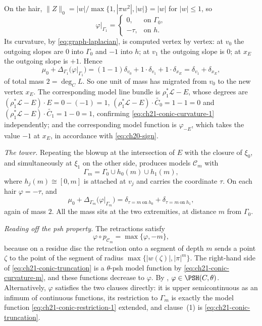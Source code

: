 \begin{example}
On the hair, $\lVert Z\rVert_0=|w|/\max\{1,|\pi w^2|,|w|\}=|w|$ for
$|w|\leq1$, so
\begin{equation}
\label{eq:ch21-conic-restriction-1}
 \varphi|_{\Gamma_1}=
 \begin{cases}
  0, & \text{on }\Gamma_0,\\
  -\tau, & \text{on }h .
 \end{cases}
\end{equation}
Its curvature, by \eqref{eq:graph-laplacian}, is computed vertex by vertex:
at $v_0$ the outgoing slopes are $0$ into $\Gamma_0$ and $-1$ into
$h$; at $v_1$ the outgoing slope is $0$; at $x_E$ the outgoing slope
is $+1$.  Hence
\begin{equation}
\label{eq:ch21-conic-curvature-1}
 \mu_0+\Delta_{\Gamma_1}\bigl(\varphi|_{\Gamma_1}\bigr)
 =(1-1)\delta_{v_0}+1\cdot\delta_{v_1}+1\cdot\delta_{x_E}
 =\delta_{v_1}+\delta_{x_E},
\end{equation}
of total mass $2=\deg_CL$.  So one unit of mass has migrated from
$v_0$ to the new vertex $x_E$.  The corresponding model line bundle is
$\rho_1^*\mathcal L-E$, whose degrees are
$(\rho_1^*\mathcal L-E)\cdot E=0-(-1)=1$,
$(\rho_1^*\mathcal L-E)\cdot\widetilde{C_0}=1-1=0$ and
$(\rho_1^*\mathcal L-E)\cdot\widetilde{C_1}=1-0=1$, confirming
\eqref{eq:ch21-conic-curvature-1} independently; and the corresponding
model function is $\varphi_{-E}$, which takes the value $-1$ at
$x_E$, in accordance with \eqref{eq:ch20-sign}.

\emph{The tower.}  Repeating the blowup at the intersection of $E$ with
the closure of $\xi_0$, and simultaneously at $\xi_1$ on the other side,
produces models $\mathcal C_m$ with
\[
 \Gamma_m=\Gamma_0\cup h_0(m)\cup h_1(m),
\]
where $h_j(m)\cong[0,m]$ is attached at $v_j$ and carries the
coordinate $\tau$.  On each hair $\varphi=-\tau$, and
\begin{equation}
\label{eq:ch21-conic-curvature-m}
 \mu_0+\Delta_{\Gamma_m}\bigl(\varphi|_{\Gamma_m}\bigr)
 =\delta_{\tau=m\ \text{on}\ h_0}+\delta_{\tau=m\ \text{on}\ h_1},
\end{equation}
again of mass $2$.  All the mass sits at the two extremities, at distance
$m$ from $\Gamma_0$.

\emph{Reading off the psh property.}  The retractions satisfy
\begin{equation}
\label{eq:ch21-conic-truncation}
 \varphi\circ p_{\mathcal C_m}=\max\{\varphi,-m\},
\end{equation}
because on a residue disc the retraction onto a segment of depth $m$ sends
a point $\zeta$ to the point of the segment of radius
$\max\{|w(\zeta)|,|\pi|^m\}$.  The right-hand side of
\eqref{eq:ch21-conic-truncation} is a $\theta$-psh model function by
\eqref{eq:ch21-conic-curvature-m}, and these functions decrease to
$\varphi$.  By ,
$\varphi\in\PSH(C,\theta)$.  Alternatively, $\varphi$ satisfies the two
clauses directly: it is upper semicontinuous as an infimum of continuous
functions, its restriction to $\Gamma_m$ is exactly the model function
\eqref{eq:ch21-conic-restriction-1} extended, and clause~(1) is
\eqref{eq:ch21-conic-truncation}.


\end{example}
